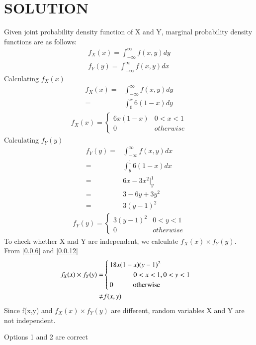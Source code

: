 \documentclass[journal,12pt,twocolumn]{IEEEtran}
\begin{document}
\section*{SOLUTION}
Given joint probability density function of X and Y, marginal probability density functions are as follows:
\begin{align}
    f_X(x) = \int_{-\infty}^{\infty} f(x,y) dy \\[0.4cm]
    f_Y(y) = \int_{-\infty}^{\infty} f(x,y) dx
\end{align}
Calculating $f_X(x)$
\begin{align}
    f_X(x) = & \int_{-\infty}^{\infty} f(x,y) dy \\
    =        & \int_{0}^{x} 6(1-x) dy            
\end{align}
\begin{align}
    f_X(x) =
    \begin{cases}
        6x(1-x) & 0<x<1     \label{0.0.6}\\
        0       & otherwise
    \end{cases}
\end{align}
Calculating $f_Y(y)$
\begin{align}
    f_Y(y) = & \int_{-\infty}^{\infty} f(x,y) dx \\
    =        & \int_{y}^{1} 6(1-x) dx\\
    =        & 6x -3{x}^2 \big|_{y}^{1}\\
    =        & 3 - 6y + 3y^{2}\\
    =        & 3{(y-1)}^{2}      
\end{align}
\begin{align}
    f_Y(y) =
    \begin{cases}
        3{(y-1)}^{2}  & 0<y<1     \label{0.0.12}\\
        0       & otherwise
    \end{cases}
\end{align}
To check whether X and Y are independent, we calculate $f_X(x) \times f_Y(y)$. From \eqref{0.0.6} and \eqref{0.0.12}
\begin{align}
    f_X(x) \times f_Y(y) = &
    \begin{cases}
        18x(1-x){(y-1)}^{2}  \\ \hspace{1.2cm}0<x<1,0<y<1\\
        0 \hspace{1cm} \text{otherwise}
    \end{cases}\\
    \neq & f(x,y)
\end{align}
Since f(x,y) and $f_X(x)\times f_Y(y)$ are different, random variables X and Y are not independent.
\begin{center}
    Options 1 and 2 are correct
\end{center}
\end{document}
